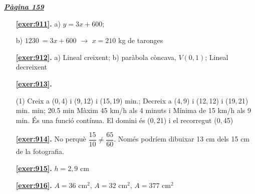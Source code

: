 \hyperlink{page.159}{\textbf{\em Pàgina 159}}
\begin{enumerate}
\item[\fontfamily{phv}\selectfont\color{blue}\textbf{\ref{exer:911}. }] \label{ans:911} 
 a) $y=3x+600$; \par b) $\mathrm {1230}\mathrm {\ }=3x+600$ $\rightarrow $ $x=210$ kg de taronges
 \end{enumerate}
\begin{enumerate}
\item[\fontfamily{phv}\selectfont\color{blue}\textbf{\ref{exer:912}. }] \label{ans:912} 
 a) Lineal creixent; \quad b) paràbola còncava, $V(0,1)$; \quad Lineal decreixent



 \item[\fontfamily{phv}\selectfont\color{blue}\textbf{\ref{exer:913}. }] \label{ans:913}
 \begin{tasks}[column-sep=1em, item-indent=1.3333em](1)
	 \task* Creix a (0,\,4) i (9,\,12) i (15,\,19) min.; Decreix a (4,\,9) i (12,\,12) i (19,\,21) min.
	  min; 20.5 min
	 \task* Màxim 45 km/h als 4 minuts i Mínima de 15 km/h als 9 min.
	 \task* És una funció contínua. El domini és (0,\,21) i el recorregut (0,\,45) 
\end{tasks}
\item[\fontfamily{phv}\selectfont\color{blue}\textbf{\ref{exer:914}. }] \label{ans:914} 
No perquè $\dfrac {15}{10} \neq \dfrac { 65}{60}$. Només podríem dibuixar 13 cm dels 15 cm de la fotografia.
\item[\fontfamily{phv}\selectfont\color{blue}\textbf{\ref{exer:915}. }] \label{ans:915} 
$h=2,9$ cm
\item[\fontfamily{phv}\selectfont\color{blue}\textbf{\ref{exer:916}. }] \label{ans:916} 
$A=36$ cm$^2$, $A=32$ cm$^2$, $A=377$ cm$^2$
 \end{enumerate}
\vspace{0.3cm}


